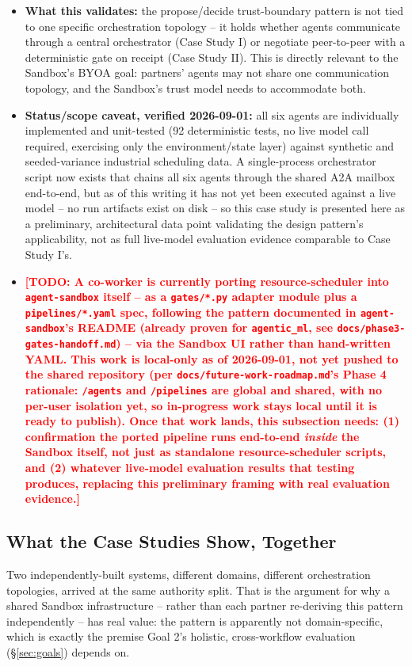 \documentclass[10pt,conference]{IEEEtran}
\newcommand{\todo}[1]{\textcolor{red}{\textbf{[TODO: #1]}}}
\begin{document}
\begin{itemize}
  \item \textbf{What this validates:} the propose/decide trust-boundary
  pattern is not tied to one specific orchestration topology -- it holds
  whether agents communicate through a central orchestrator (Case Study I)
  or negotiate peer-to-peer with a deterministic gate on receipt (Case
  Study II). This is directly relevant to the Sandbox's BYOA goal:
  partners' agents may not share one communication topology, and the
  Sandbox's trust model needs to accommodate both.
  \item \textbf{Status/scope caveat, verified 2026-09-01:} all six agents
  are individually implemented and unit-tested (92 deterministic tests,
  no live model call required, exercising only the environment/state
  layer) against synthetic and seeded-variance industrial scheduling data.
  A single-process orchestrator script now exists that chains all six
  agents through the shared A2A mailbox end-to-end, but as of this writing
  it has not yet been executed against a live model -- no run artifacts
  exist on disk -- so this case study is presented here as a preliminary,
  architectural data point validating the design pattern's applicability,
  not as full live-model evaluation evidence comparable to Case Study I's.
  \item \todo{A co-worker is currently porting resource-scheduler into
  \texttt{agent-sandbox} itself -- as a \texttt{gates/*.py} adapter module
  plus a \texttt{pipelines/*.yaml} spec, following the pattern documented
  in \texttt{agent-sandbox}'s README (already proven for
  \texttt{agentic\_ml}, see \texttt{docs/phase3-gates-handoff.md}) -- via
  the Sandbox UI rather than hand-written YAML. This work is local-only as
  of 2026-09-01, not yet pushed to the shared repository (per
  \texttt{docs/future-work-roadmap.md}'s Phase 4 rationale: \texttt{/agents}
  and \texttt{/pipelines} are global and shared, with no per-user isolation
  yet, so in-progress work stays local until it is ready to publish). Once
  that work lands, this subsection needs: (1) confirmation the ported
  pipeline runs end-to-end \emph{inside} the Sandbox itself, not just as
  standalone resource-scheduler scripts, and (2) whatever live-model
  evaluation results that testing produces, replacing this preliminary
  framing with real evaluation evidence.}
\end{itemize}

\subsection{What the Case Studies Show, Together}
Two independently-built systems, different domains, different orchestration
topologies, arrived at the same authority split. That is the argument for
why a shared Sandbox infrastructure -- rather than each partner re-deriving
this pattern independently -- has real value: the pattern is apparently not
domain-specific, which is exactly the premise Goal 2's holistic,
cross-workflow evaluation (\S\ref{sec:goals}) depends on.
\end{document}
